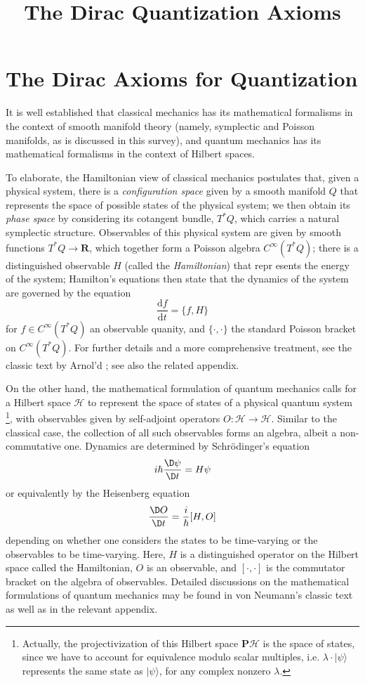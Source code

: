 \documentclass{tufte-handout}
\title{The Dirac Quantization Axioms}
\def\d{\mathrm{d}}
\begin{document}
\section{The Dirac Axioms for Quantization}
It is well established that classical mechanics has its mathematical formalisms in the context of smooth manifold theory (namely, symplectic and Poisson manifolds, as is discussed in this survey), and quantum mechanics has its mathematical formalisms in the context of Hilbert spaces.

To elaborate, the Hamiltonian view of classical mechanics postulates that, given a physical system, there is a \emph{configuration space} given by a smooth manifold $Q$ that represents the space of possible states of the physical system; we then obtain its \emph{phase space} by considering its cotangent bundle, $T^*Q$, which carries a natural symplectic structure. Observables of this physical system are given by smooth functions $T^*Q \to \mathbf{R}$, which together form a Poisson algebra $C^\infty(T^*Q)$; there is a distinguished observable $H$ (called the \emph{Hamiltonian}) that repr
esents the energy of the system; Hamilton's equations then state that the dynamics of the system are governed by the equation
$$
\frac{\d f}{\d t} = \{f,H\}
$$
for $f \in C^\infty(T^*Q)$ an observable quanity, and $\{\cdot,\cdot\}$ the standard Poisson bracket on $C^\infty(T^*Q)$.
For further details and a more comprehensive treatment, see the classic text by Arnol'd \cite{arnold}; see also the related appendix.

On the other hand, the mathematical formulation of quantum mechanics calls for a Hilbert space $\mathcal{H}$ to represent the space of states of a physical quantum system \footnote{Actually, the projectivization of this Hilbert space $\mathbf{P}\mathcal{H}$ is the space of states, since we have to account for equivalence modulo scalar multiples, i.e. $\lambda \cdot |\psi\rangle$ represents the same state as $|\psi\rangle$, for any complex nonzero $\lambda$.}, with observables given by self-adjoint operators $O: \mathcal{H} \to \mathcal{H}$. Similar to the classical case, the collection of all such observables forms an algebra, albeit a non-commutative one. Dynamics are determined by Schr\"{o}dinger's equation
$$
i\hbar \frac{\D\psi}{\D t} = H\psi
$$
or equivalently by the Heisenberg equation
$$
\frac{\D O}{\D t} = \frac{i}{\hbar}[H,O]
$$
depending on whether one considers the states to be time-varying or the observables to be time-varying. Here, $H$ is a distinguished operator on the Hilbert space called the Hamiltonian, $O$ is an observable, and $[\cdot,\cdot]$ is the commutator bracket on the algebra of observables.
Detailed discussions on the mathematical formulations of quantum mechanics may be found in von Neumann's classic text \cite{vonNeumann} as well as in the relevant appendix.
\end{document}

